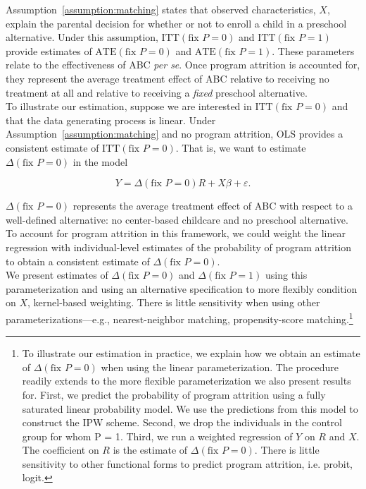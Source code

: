 \noindent Assumption~\ref{assumption:matching} states that observed characteristics, $X$, explain the parental decision for whether or not to enroll a child in a preschool alternative. Under this assumption, $\text{ITT} \left( \text{fix } P = 0 \right) $ and $\text{ITT} \left( \text{fix } P = 1 \right)$ provide estimates of $\text{ATE} \left( \text{fix } P = 0 \right)$ and $\text{ATE} \left( \text{fix } P = 1 \right)$. These parameters relate to the effectiveness of ABC \emph{per se}. Once program attrition is accounted for, they represent the average treatment effect of ABC relative to receiving no treatment at all and relative to receiving a \textit{fixed} preschool alternative.\\

\noindent To illustrate our estimation, suppose we are interested in $\text{ITT} \left( \text{fix } P = 0 \right)$ and that the data generating process is linear. Under Assumption~\ref{assumption:matching} and no program attrition, OLS provides a consistent estimate of $\text{ITT} \left( \text{fix } P = 0 \right)$. That is, we want to estimate $\Delta \left( \text{fix } P = 0 \right)$ in the model

\begin{equation}
Y = \Delta \left( \text{fix } P = 0 \right) R + X \beta + \varepsilon. \label{eq:ittmodel}
\end{equation}

\noindent $\Delta \left( \text{fix } P = 0 \right)$ represents the average treatment effect of ABC with respect to a well-defined alternative: no center-based childcare and no preschool alternative. To account for program attrition in this framework, we could weight the linear regression with individual-level estimates of the probability of program attrition to obtain a consistent estimate of $\Delta \left( \text{fix } P = 0 \right)$.\\

\noindent We present estimates of $\Delta \left( \text{fix } P = 0 \right)$ and $\Delta \left( \text{fix } P = 1 \right)$ using this parameterization and using an alternative specification to more flexibly condition on $X$, kernel-based weighting. There is little sensitivity when using other parameterizations---e.g., nearest-neighbor matching, propensity-score matching.\footnote{To illustrate our estimation in practice, we explain how we obtain an estimate of $\Delta \left( \text{fix } P = 0 \right)$ when using the linear parameterization. The procedure readily extends to the more flexible parameterization we also present results for. First, we predict the probability of program attrition using a fully saturated linear probability model. We use the predictions from this model to construct the IPW scheme. Second, we drop the individuals in the control group for whom P = 1. Third, we run a weighted regression of $Y$ on $R$ and $X$. The coefficient on $ R $ is the estimate of $\Delta \left( \text{fix } P = 0 \right)$. There is little sensitivity to other functional forms to predict program attrition, i.e. probit, logit.}

